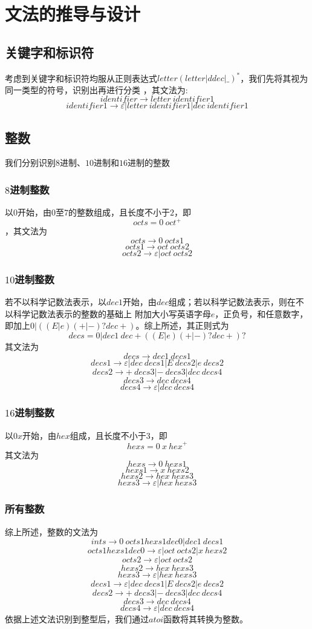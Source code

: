 \documentclass[UTF8]{ctexart}
\begin{document}
\section{文法的推导与设计}
\subsection{关键字和标识符}
考虑到关键字和标识符均服从正则表达式$letter (letter|ddec|\_)^*$，我们先将其视为同一类型的符号，识别出再进行分类
，其文法为:
$$ identifier \rightarrow letter \ identifier1 $$
$$ identifier1 \rightarrow \varepsilon | letter \ identifier1 | dec \ identifier1 $$
\subsection{整数}
我们分别识别$8$进制、$10$进制和$16$进制的整数
\subsubsection{$8$进制整数}
以$0$开始，由$0$至$7$的整数组成，且长度不小于$2$，即
$$ octs = 0 \ {oct}^+ $$
，其文法为
$$ octs \rightarrow 0 \ octs1 $$
$$ octs1 \rightarrow oct \ octs2 $$
$$ octs2 \rightarrow \varepsilon | oct \ octs2 $$
\subsubsection{$10$进制整数}
若不以科学记数法表示，以$dec1$开始，由$dec$组成；若以科学记数法表示，则在不以科学记数法表示的整数的基础上
附加大小写英语字母$e$，正负号，和任意数字，即加上$0|((E|e)(+|-)?dec+)$。综上所述，其正则式为
$$ decs = 0 | dec1 \ dec+((E|e)(+|-)?dec+)? $$
其文法为
$$ decs \rightarrow dec1 \ decs1  $$
$$ decs1 \rightarrow \varepsilon | dec \ decs1 | E \ decs2 | e \ decs2 $$
$$ decs2 \rightarrow + \ decs3 | - \ decs3 | dec \ decs4  $$
$$ decs3 \rightarrow dec \ decs4  $$
$$ decs4 \rightarrow \varepsilon | dec \ decs4  $$
\subsubsection{$16$进制整数}
以$0x$开始，由$hex$组成，且长度不小于$3$，即
$$ hexs = 0 \ x  \ {hex}^+ $$
其文法为
$$ hexs \rightarrow 0 \ hexs1 $$
$$ hexs1 \rightarrow x \ hexs2 $$
$$ hexs2 \rightarrow hex \ hexs3 $$
$$ hexs3 \rightarrow \varepsilon | hex \ hexs3 $$
\subsubsection{所有整数}
综上所述，整数的文法为
$$ ints \rightarrow 0 \ octs1hexs1dec0 | dec1 \ decs1 $$
$$ octs1hexs1dec0 \rightarrow \varepsilon | oct \ octs2 | x \ hexs2 $$
$$ octs2 \rightarrow \varepsilon | oct \ octs2 $$
$$ hexs2 \rightarrow hex \ hexs3 $$
$$ hexs3 \rightarrow \varepsilon | hex \ hexs3 $$
$$ decs1 \rightarrow \varepsilon | dec \ decs1 | E \ decs2 | e \ decs2 $$
$$ decs2 \rightarrow + \ decs3 | - \ decs3 | dec \ decs4  $$
$$ decs3 \rightarrow dec \ decs4  $$
$$ decs4 \rightarrow \varepsilon | dec \ decs4  $$
依据上述文法识别到整型后，我们通过$atoi$函数将其转换为整数。
\end{document}
